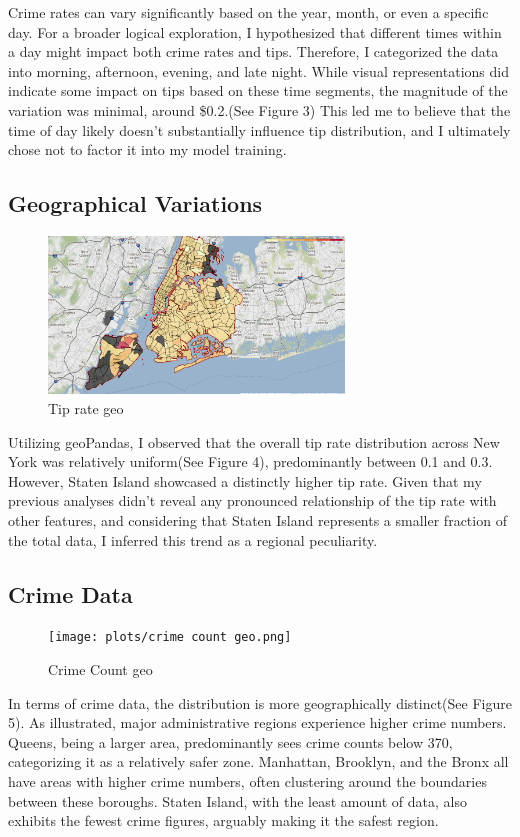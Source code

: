 \documentclass[11pt]{article}
\begin{document}
Crime rates can vary significantly based on the year, month, or even a specific day. For a broader logical exploration, I hypothesized that different times within a day might impact both crime rates and tips. Therefore, I categorized the data into morning, afternoon, evening, and late night. While visual representations did indicate some impact on tips based on these time segments, the magnitude of the variation was minimal, around \$0.2.(See Figure 3) This led me to believe that the time of day likely doesn't substantially influence tip distribution, and I ultimately chose not to factor it into my model training.


\subsection{Geographical Variations}

\begin{figure}[h]
    \includegraphics[width=0.7\textwidth]{plots/tip rate geo.png}
    \centering
    \caption{Tip rate geo}
\end{figure}

Utilizing geoPandas, I observed that the overall tip rate distribution across New York was relatively uniform(See Figure 4), predominantly between 0.1 and 0.3. However, Staten Island showcased a distinctly higher tip rate. Given that my previous analyses didn't reveal any pronounced relationship of the tip rate with other features, and considering that Staten Island represents a smaller fraction of the total data, I inferred this trend as a regional peculiarity.

\subsection{Crime Data}

\begin{figure}[h]
    \texttt{[image: plots/crime count geo.png]}
    \centering
    \caption{Crime Count geo}
\end{figure}
In terms of crime data, the distribution is more geographically distinct(See Figure 5). As illustrated, major administrative regions experience higher crime numbers. Queens, being a larger area, predominantly sees crime counts below 370, categorizing it as a relatively safer zone. Manhattan, Brooklyn, and the Bronx all have areas with higher crime numbers, often clustering around the boundaries between these boroughs. Staten Island, with the least amount of data, also exhibits the fewest crime figures, arguably making it the safest region.
\end{document}
